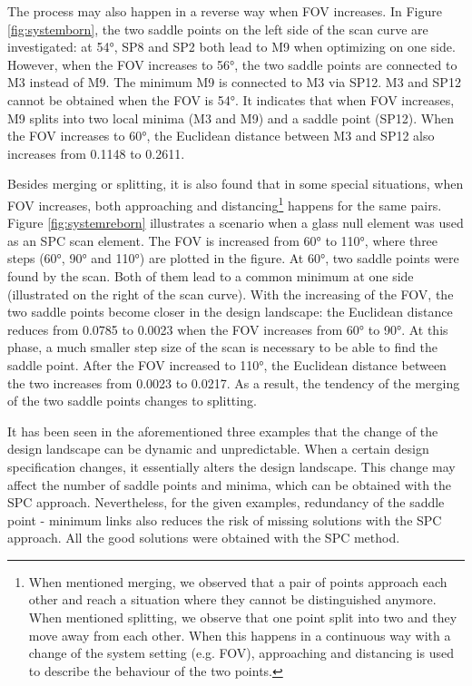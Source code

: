 The process may also happen in a reverse way when FOV increases. In Figure \ref{fig:systemborn}, the two saddle points on the left side of the scan curve are investigated: at 54°, SP8 and SP2 both lead to M9 when optimizing on one side. However, when the FOV increases to 56°, the two saddle points are connected to M3 instead of M9. The minimum M9 is connected to M3 via SP12. M3 and SP12 cannot be obtained when the FOV is 54°. It indicates that when FOV increases, M9 splits into two local minima (M3 and M9) and a saddle point (SP12). When the FOV increases to 60°, the Euclidean distance between M3 and SP12 also increases from 0.1148 to 0.2611. 

Besides merging or splitting, it is also found that in some special situations, when FOV increases, both approaching and distancing\footnote{When mentioned merging, we observed that a pair of points approach each other and reach a situation where they cannot be distinguished anymore. When mentioned splitting, we observe that one point split into two and they move away from each other. When this happens in a continuous way with a change of the system setting (e.g. FOV), approaching and distancing is used to describe the behaviour of the two points.} happens for the same pairs. Figure \ref{fig:systemreborn} illustrates a scenario when a glass null element was used as an SPC scan element. The FOV is increased from 60° to 110°, where three steps (60°, 90° and 110°) are plotted in the figure. At 60°, two saddle points were found by the scan. Both of them lead to a common minimum at one side (illustrated on the right of the scan curve). With the increasing of the FOV, the two saddle points become closer in the design landscape: the Euclidean distance reduces from 0.0785 to 0.0023 when the FOV increases from 60° to 90°. At this phase, a much smaller step size of the scan is necessary to be able to find the saddle point. After the FOV increased to 110°, the Euclidean distance between the two increases from 0.0023 to 0.0217. As a result, the tendency of the merging of the two saddle points changes to splitting. 

It has been seen in the aforementioned three examples that the change of the design landscape can be dynamic and unpredictable. When a certain design specification changes, it essentially alters the design landscape. This change may affect the number of saddle points and minima, which can be obtained with the SPC approach. Nevertheless, for the given examples, redundancy of the saddle point - minimum links also reduces the risk of missing solutions with the SPC approach. All the good solutions were obtained with the SPC method.

